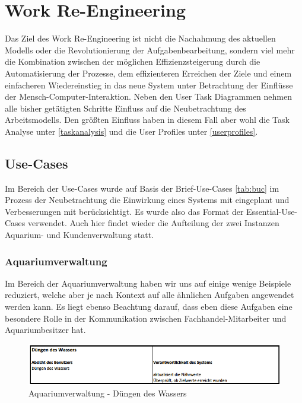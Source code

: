 \chapter{Work Re-Engineering}\label{reengineering}
Das Ziel des Work Re-Engineering ist nicht die Nachahmung des aktuellen Modells oder die Revolutionierung der Aufgabenbearbeitung, sondern viel mehr die Kombination zwischen der möglichen Effizienzsteigerung durch die Automatisierung der Prozesse, dem effizienteren Erreichen der Ziele und einem einfacheren Wiedereinstieg in das neue System unter Betrachtung der Einflüsse der Mensch-Computer-Interaktion.\cite{Mayhew:UEL}
Neben den User Task Diagrammen nehmen alle bisher getätigten Schritte Einfluss auf die Neubetrachtung des Arbeitsmodells. Den größten Einfluss haben in diesem Fall aber wohl die Task Analyse unter \ref{taskanalysis} und die User Profiles unter \ref{userprofiles}. 

\section{Use-Cases}
Im Bereich der Use-Cases wurde auf Basis der Brief-Use-Cases \ref{tab:buc} im Prozess der Neubetrachtung die Einwirkung eines Systems mit eingeplant und Verbesserungen mit berücksichtigt. Es wurde also das Format der Essential-Use-Cases verwendet. Auch hier findet wieder die Aufteilung der zwei Instanzen Aquarium- und Kundenverwaltung statt.

\subsection{Aquariumverwaltung}
Im Bereich der Aquariumverwaltung haben wir uns auf einige wenige Beispiele reduziert, welche aber je nach Kontext auf alle ähnlichen Aufgaben angewendet werden kann. Es liegt ebenso Beachtung darauf, dass eben diese Aufgaben eine besondere Rolle in der Kommunikation zwischen Fachhandel-Mitarbeiter und Aquariumbesitzer hat.

\begin{figure}
	\centering
	\includegraphics[width=\linewidth,height=\textheight,
keepaspectratio]{euc_aq_1}
	\caption{Aquariumverwaltung - Düngen des Wassers}
	\label{euc:aq:1}
\end{figure}

